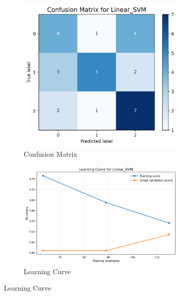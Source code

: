 \documentclass[10pt]{article}
\begin{document}
    \begin{figure}[!ht]
        \begin{subfigure}{0.5\textwidth}
            \centering
            \includegraphics[width=0.9\textwidth]{code/ResultsMainAugZip/plots/Block4_SVM_Variants_Experiment_II/confusion_matrix_Linear_SVM.png}
            \caption{Confusion Matrix}
        \end{subfigure}
        \begin{subfigure}{0.5\textwidth}
            \centering
            \includegraphics[width=0.9\textwidth]{code/ResultsMainAugZip/plots/Block4_SVM_Variants_Experiment_II/learning_curve_Linear_SVM.png}
            \caption{Learning Curve}
        \end{subfigure}
    \end{figure}
\end{document}
